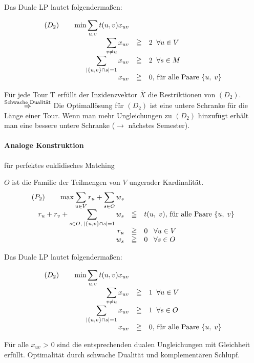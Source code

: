 Das Duale LP lautet folgendermaßen:

\[\begin{array}{rcl}
(D_{2}) \hspace{7mm} \min \displaystyle \sum_{u,v} t(u,v) x_{u v}\\
\displaystyle \sum_{v\not= u} x_{u v} &\geqq & 2 \; \; \forall u \in V\\
\displaystyle \sum_{\left| \{u,v\} \cap s \right| =1} x_{u v} &\geqq& 2  \;
\; \forall s \in M\\
x_{u v} &\geqq & 0 \mbox{, für alle Paare } \{u,\; v\} 
\end{array}\]

Für jede Tour T erfüllt der Inzidenzvektor $\bar{X}$ die Restriktionen von 
$(D_{2})$.\\
$\stackrel{\mbox{\scriptsize Schwache Dualität}}{\Rightarrow}$ Die Optimallösung
für $(D_{2})$ ist eine untere Schranke für die Länge einer Tour. Wenn man
mehr Ungleichungen zu $(D_{2})$ hinzufügt erhält man eine bessere untere
Schranke ($\rightarrow$ nächstes Semester).

\paragraph{Analoge Konstruktion} für perfektes euklidisches Matching

$O$ ist die Familie der Teilmengen von $V$ ungerader Kardinalität.
\[\begin{array}{rcl}
(P_{2}) \hspace{7mm}  \max \displaystyle \sum_{u \in V} r_{u}
+ \sum_{s\in O}  w_{s}\\
r_{u} + r_{v} + \displaystyle \sum_{s \in O, \; \left| \{u,v\} \cap s
\right| =1} w_{s}&\leqq& t(u,\; v) \mbox{, für alle Paare }\{u,\; v\}\\
r_{u} &\geqq&0 \; \; \; \forall u\in V\\
w_{s} &\geqq& 0 \; \; \; \forall s \in O
\end{array}
\]

Das Duale LP lautet folgendermaßen:

\[\begin{array}{rcl}
(D_{2}) \hspace{7mm} \min \displaystyle \sum_{u,v} t(u,v) x_{u v}\\
\displaystyle \sum_{v\not= u} x_{u v} &\geqq & 1 \; \; \forall u \in V\\
\displaystyle \sum_{\left| \{u,v\} \cap s \right| =1} x_{u v} &\geqq& 1 \;
\; \forall s \in O\\
x_{u v} &\geqq & 0 \mbox{, für alle Paare } \{u,\; v\} 
\end{array}\]

Für alle $x_{u v}$ > 0 sind die entsprechenden dualen Ungleichungen mit
Gleichheit erfüllt.
Optimalität durch schwache Dualität und komplementären Schlupf.


